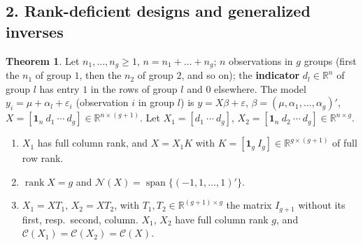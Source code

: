 \documentclass[12pt]{article}
\newcommand{\R}{\mathbb R}
\newcommand{\one}{\mathbf 1}
\DeclareMathOperator{\rank}{rank}
\DeclareMathOperator{\Span}{span}
\theoremstyle{definition}
\newtheorem{theorem}{Theorem}
\begin{document}
\subsection*{2. Rank-deficient designs and generalized inverses}

\begin{theorem}\label{h-thm-oneway}
Let \(n_1,\dots,n_g\geqslant1\), \(n=n_1+\dots+n_g\); \(n\) observations in \(g\) groups (first the \(n_1\) of group
\(1\), then the \(n_2\) of group \(2\), and so on); the \textbf{indicator} \(d_l\in\R^n\) of group \(l\) has entry \(1\) in
the rows of group \(l\) and \(0\) elsewhere. The model \(y_i=\mu+\alpha_l+\varepsilon_i\) (observation \(i\) in group
\(l\)) is \(y=X\beta+\varepsilon\), \(\beta=(\mu,\alpha_1,\dots,\alpha_g)'\), \(X=[\one_n\ d_1\ \cdots\ d_g]\in\R^{n\times(g+1)}\).
Let \(X_1=[d_1\ \cdots\ d_g]\), \(X_2=[\one_n\ d_2\ \cdots\ d_g]\in\R^{n\times g}\).
\begin{enumerate}
\item \(X_1\) has full column rank, and \(X=X_1K\) with \(K=[\one_g\ I_g]\in\R^{g\times(g+1)}\) of full row rank.
\item \(\rank X=g\) and \(\mathcal N(X)=\Span\{(-1,1,\dots,1)'\}\).
\item \(X_1=XT_1\), \(X_2=XT_2\), with \(T_1,T_2\in\R^{(g+1)\times g}\) the matrix \(I_{g+1}\) without its first, resp.\
second, column. \(X_1\), \(X_2\) have full column rank \(g\), and \(\mathcal C(X_1)=\mathcal C(X_2)=\mathcal C(X)\).
\end{enumerate}
\end{theorem}
\end{document}

